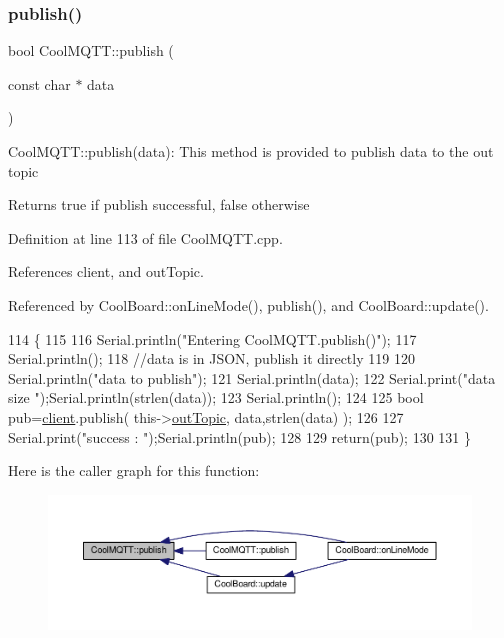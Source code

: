 \subsubsection{\texorpdfstring{publish()}{publish()}\hspace{0.1cm}{\footnotesize\ttfamily [1/2]}}
{\footnotesize\ttfamily bool Cool\+M\+Q\+T\+T\+::publish (\begin{DoxyParamCaption}\item[{const char $\ast$}]{data }\end{DoxyParamCaption})}

Cool\+M\+Q\+T\+T\+::publish(data)\+: This method is provided to publish data to the out topic

\begin{DoxyReturn}{Returns}
true if publish successful, false otherwise 
\end{DoxyReturn}


Definition at line 113 of file Cool\+M\+Q\+T\+T.\+cpp.



References client, and out\+Topic.



Referenced by Cool\+Board\+::on\+Line\+Mode(), publish(), and Cool\+Board\+::update().


\begin{DoxyCode}
114 \{
115 
116     Serial.println(\textcolor{stringliteral}{"Entering CoolMQTT.publish()"});
117     Serial.println();
118     \textcolor{comment}{//data is in JSON, publish it directly}
119 
120     Serial.println(\textcolor{stringliteral}{"data to publish"});
121     Serial.println(data);
122     Serial.print(\textcolor{stringliteral}{"data size "});Serial.println(strlen(data));
123     Serial.println();
124     
125     \textcolor{keywordtype}{bool} pub=\hyperlink{classCoolMQTT_a4ca71e4f76ef868692a297efd45b1415}{client}.publish( this->\hyperlink{classCoolMQTT_a109c786a17b463f9eeba046194279522}{outTopic}, data,strlen(data) );
126     
127     Serial.print(\textcolor{stringliteral}{"success : "});Serial.println(pub); 
128 
129     \textcolor{keywordflow}{return}(pub);
130 
131 \}
\end{DoxyCode}
Here is the caller graph for this function\+:
\nopagebreak
\begin{figure}[H]
\begin{center}
\leavevmode
\includegraphics[width=350pt]{classCoolMQTT_ace977b3e90ab14b1199fe5c4fb0a13ec_icgraph}
\end{center}
\end{figure}
\mbox{\label{classCoolMQTT_a65a506641740ce797ceadd4fa8a286d3}} 
